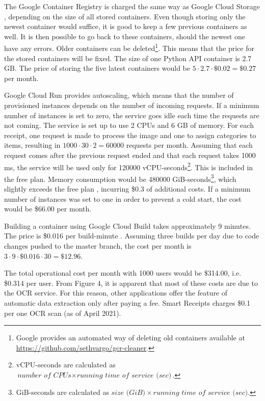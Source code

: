 \documentclass[
  printed, %
  table,   %
  oneside, %
  lof,     %
  lot,     %
]{fithesis3}
\begin{document}
The Google Container Registry is charged the same way as Google Cloud Storage \cite{ContainerRegistryPricing}, depending on the size of all stored containers. Even though storing only the newest container would suffice, it is good to keep a few previous containers as well. It is then possible to go back to these containers, should the newest one have any errors. Older containers can be deleted\footnote{Google provides an automated way of deleting old containers available at \url{https://github.com/sethvargo/gcr-cleaner}.}. This means that the price for the stored containers will be fixed. The size of one Python API container is 2.7 GB. The price of storing the five latest containers would be $5 \cdot 2.7 \cdot \$0.02 = \$0.27$ per month. 

Google Cloud Run provides autoscaling, which means that the number of provisioned instances depends on the number of incoming requests. If a minimum number of instances is set to zero, the service goes idle each time the requests are not coming. The service is set up to use 2 CPUs and 6 GB of memory. For each receipt, one request is made to process the image and one to assign categories to items, resulting in $\num{1000} \cdot 30 \cdot 2 = \num{60000}$ requests per month. Assuming that each request comes after the previous request ended and that each request takes \num{1000} ms, the service will be used only for \num{120000} vCPU-seconds\footnote{vCPU-seconds are calculated as $\textit{number of CPUs} \times \textit{running time of service (sec)}$.}. This is included in the free plan. Memory consumption would be \num{480000} GiB-seconds\footnote{GiB-seconds are calculated as $\textit{size (GiB)} \times \textit{running time of service (sec)}.$}, which slightly exceeds the free plan \cite{CloudRunPricing}, incurring \$0.3 of additional costs. 
If a minimum number of instances was set to one in order to prevent a cold start, the cost would be \$66.00 per month.

Building a container using Google Cloud Build takes approximately 9 minutes. The price is \$0.016 per build-minute \cite{CloudBuildPricing}. Assuming three builds per day due to code changes pushed to the master branch, the cost per month is $3 \cdot 9 \cdot \$0.016 \cdot 30 = \$12.96$.

The total operational cost per month with \num{1000} users would be \$314.00, i.e. \$0.314 per user.
From Figure 4, it is apparent that most of these costs are due to the OCR service. For this reason, other applications offer the feature of automatic data extraction only after paying a fee. Smart Receipts charges \$0.1 per one OCR scan (as of April 2021).
\end{document}
